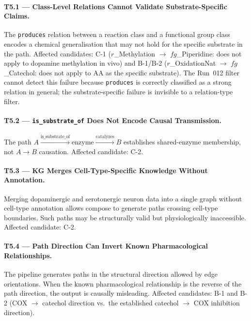 \paragraph{T5.1 --- Class-Level Relations Cannot Validate Substrate-Specific Claims.}
The \texttt{produces} relation between a reaction class and a functional group class
encodes a chemical generalisation that may not hold for the specific substrate in
the path.
Affected candidates: C-1 ($r$\_Methylation $\to$ $fg$\_Piperidine: does not apply
to dopamine methylation in vivo) and B-1/B-2
($r$\_OxidationNat $\to$ $fg$\_Catechol: does not apply to AA as the specific
substrate).
The Run~012 filter cannot detect this failure because \texttt{produces} is
correctly classified as a strong relation in general; the substrate-specific
failure is invisible to a relation-type filter.

\paragraph{T5.2 --- \texttt{is\_substrate\_of} Does Not Encode Causal Transmission.}
The path $A \xrightarrow{\text{is\_substrate\_of}} \mathrm{enzyme}
\xrightarrow{\text{catalyzes}} B$ establishes shared-enzyme membership, not
$A \to B$ causation.
Affected candidate: C-2.

\paragraph{T5.3 --- KG Merges Cell-Type-Specific Knowledge Without Annotation.}
Merging dopaminergic and serotonergic neuron data into a single graph without
cell-type annotation allows compose to generate paths crossing cell-type boundaries.
Such paths may be structurally valid but physiologically inaccessible.
Affected candidate: C-2.

\paragraph{T5.4 --- Path Direction Can Invert Known Pharmacological Relationships.}
The pipeline generates paths in the structural direction allowed by edge orientations.
When the known pharmacological relationship is the reverse of the path direction,
the output is causally misleading.
Affected candidates: B-1 and B-2 (COX $\to$ catechol direction vs.\ the established
catechol $\to$ COX inhibition direction).
